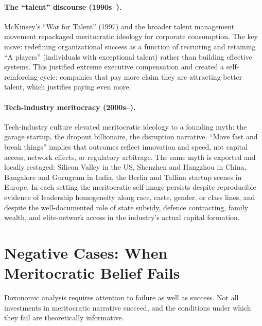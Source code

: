 \paragraph{The ``talent'' discourse (1990s--).}
McKinsey's ``War for Talent'' (1997) and the broader talent management movement repackaged meritocratic ideology for corporate consumption.
The key move: redefining organizational success as a function of recruiting and retaining ``A players'' (individuals with exceptional talent) rather than building effective systems.
This justified extreme executive compensation and created a self-reinforcing cycle: companies that pay more claim they are attracting better talent, which justifies paying even more.

\paragraph{Tech-industry meritocracy (2000s--).}
Tech-industry culture elevated meritocratic ideology to a founding myth: the garage startup, the dropout billionaire, the disruption narrative.
``Move fast and break things'' implies that outcomes reflect innovation and speed, not capital access, network effects, or regulatory arbitrage.
The same myth is exported and locally restaged: Silicon Valley in the US, Shenzhen and Hangzhou in China, Bangalore and Gurugram in India, the Berlin and Tallinn startup scenes in Europe.
In each setting the meritocratic self-image persists despite reproducible evidence of leadership homogeneity along race, caste, gender, or class lines, and despite the well-documented role of state subsidy, defence contracting, family wealth, and elite-network access in the industry's actual capital formation.

\section{Negative Cases: When Meritocratic Belief Fails}
\label{sec:ch22-negative}

Doxonomic analysis requires attention to failure as well as success.
Not all investments in meritocratic narrative succeed, and the conditions under which they fail are theoretically informative.

